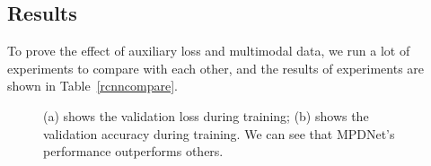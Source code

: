 \documentclass[journal]{IEEEtran}
\begin{document}
\subsection{Results}
\label{results}
To prove the effect of auxiliary loss and multimodal data, we run a lot of experiments to compare with each other, and the results of experiments are shown in Table~\ref{rcnncompare}.
\begin{figure}[htbp]
    \centering
    \centering
    \caption{(a) shows the validation loss during training; (b) shows the validation accuracy during training. We can see that MPDNet's performance outperforms others.
    }
    \label{loss}

    \end{figure}
\end{document}
